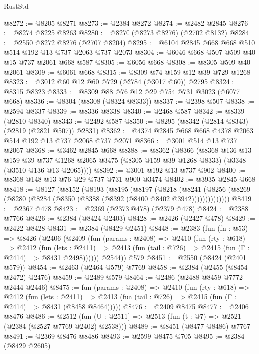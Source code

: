 \begin{lexlean}{RustStd}
\begin{coremodule}
@8272 := @8205 @8271
@8273 := @2384 @8272
@8274 := @2482 @2845
@8276 := @8274 @8225 @8263
@8280 := @8270 (@8273 @8276) (@2702 @8132)
@8284 := @2550 @8272 @8276 (@2707 @8204)
@8295 := @6104 @2845 @668 @668 @510 @514 @192 @13 @737 @2063 @737 @2073
@8304 := @6046 @668 @507 @509 @40 @15 @737 @2061 @668 @587
@8305 := @6056 @668
@8308 := @8305 @509 @40 @2061
@8309 := @6061 @668
@8315 := @8309 @74 @159 @12 @39 @729 @1268
@8323 := @3012 @60 @12 @60 @729 (@2784 (@3017 @60)) @2795
@8324 := @8315 @8323
@8333 := @8309 @88 @76 @12 @29 @754 @731 @3023 (@6077 @668)
@8336 := @8304 (@8308 (@8324 @8333))
@8337 := @2398 @507
@8338 := @2594 @8337
@8339 := @8336 @8338
@8340 := @2468 @587
@8342 := @8339 (@2810 @8340)
@8343 := @2492 @587
@8350 := @8295 (@8342 (@2814 @8343) (@2819 (@2821 @507)) @2831)
@8362 := @4374 @2845 @668 @668 @4378 @2063 @514 @192 @13 @737 @2068 @737 @2071
@8366 := @3001 @514 @13 @737 @2067
@8368 := @3462 @2845 @668
@8388 := @8362
    (@8366
      (@8368
        @136
        @13
        @159
        @39
        @737
        @1268
        @2065
        @3475
        (@8305 @159 @39 @1268 @8333)
        (@3348 (@3510 @136 @13 @2065))))
@8392 := @3001 @192 @13 @737 @902
@8400 := @8368 @148 @13 @76 @29 @737 @731 @900 @3474
@8402 := @3935 @2845 @668
@8418 := @8127
    (@8152
      (@8193
        (@8195
          (@8197
            (@8218
              (@8241
                (@8256 (@8269 (@8280 (@8284 (@8350 (@8388 (@8392 (@8400 @8402 @3942))))))))))))))
@8419 := @2367 @478
@8423 := @2369 (@2373 @478) (@2379 @478)
@8424 := @2388 @7766
@8426 := @2384 (@8424 @2403)
@8428 := @2426 (@2427 @478)
@8429 := @2422 @8428
@8431 := @2384 (@8429 @2451)
@8448 := @2383
    (fun (fn : @53) =>
    @8426
      (@2406
        (@2409
          (fun (params : @2408) =>
          @2410
            (fun (rty : @618) =>
            @2412
              (fun (lets : @2411) =>
              @2413 (fun (tail : @726) => @2415 (fun (Γ : @2414) => @8431 @2498))))))
        @2544))
    @579
@8451 := @2550 (@8424 (@2401 @579))
@8454 := @2463 (@2464 @579) @7769
@8458 := @2384 (@2455 (@8454 @2472) @2476)
@8459 := @2489 @579
@8464 := @2486 (@2488 @8459 @7772 @2444 @2446)
@8475 := fun (params : @2408) =>
  @2410
    (fun (rty : @618) =>
    @2412
      (fun (lets : @2411) =>
      @2413 (fun (tail : @726) => @2415 (fun (Γ : @2414) => @8431 (@8458 @8464)))))
@8476 := @2409 @8475
@8477 := @2406 @8476
@8486 := @2512 (fun (U : @2511) => @2513 (fun (t : @7) => @2521 (@2384 (@2527 @7769 @2402) @2538)))
@8489 := @8451 (@8477 @8486) @7767
@8491 := @2369 @8476 @8486
@8493 := @2599 @8475 @705
@8495 := @2384 (@8429 @2605)

\end{coremodule}
\end{lexlean}
